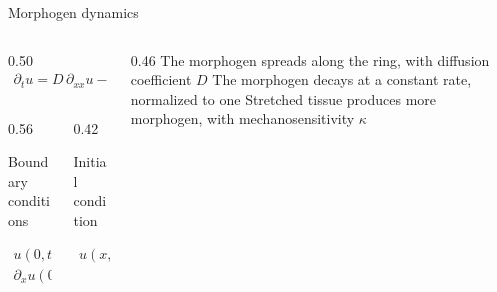 \begin{frame}{Morphogen dynamics}

  \vspace{-0.10cm}

  \begin{columns}[c,onlytextwidth]
    \begin{column}{0.50\textwidth}
      {\color{HydraWhite}\bfseries\fontsize{12.4}{15.6}\selectfont
      \begin{align*}
        \boxed{
          \partial_tu
          =
          D\,\partial_{xx}u
          -u
          +\kappa\varepsilon
        }
      \end{align*}
      }
      \par
      \vspace{-0.18cm}
      \begin{columns}[t,onlytextwidth]
        \begin{column}{0.56\textwidth}
          \centering
          {\color{HydraMuted}\fontsize{6.8}{8.4}\selectfont
            Boundary conditions
          \par}
          \vspace{-0.30cm}
          {\color{HydraWhite}\fontsize{8}{10.2}\selectfont
          \begin{align*}
            u(0,t)&=u(L,t)
            \\
            \partial_xu(0,t)&=\partial_xu(L,t)
          \end{align*}
          }
        \end{column}

        \begin{column}{0.42\textwidth}
          \centering
          {\color{HydraMuted}\fontsize{6.8}{8.4}\selectfont
            Initial condition
          \par}
          \vspace{-0.30cm}
          {\color{HydraWhite}\fontsize{8}{10.2}\selectfont
          \begin{align*}
            u(x,0)&=u_0(x)
          \end{align*}
          }
        \end{column}
      \end{columns}
    \end{column}

    \begin{column}{0.46\textwidth}
        {The morphogen spreads along the ring, with diffusion coefficient $D$}
      \vspace{-0.04cm}
        {The morphogen decays at a constant rate, normalized to one}
      \vspace{-0.04cm}
        {Stretched tissue produces more morphogen, with mechanosensitivity $\kappa$}
    \end{column}
  \end{columns}

\end{frame}


